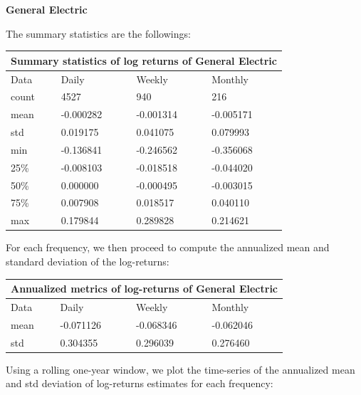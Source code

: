 \documentclass[10pt]{article}
\newenvironment{exercise}[2][Exercise]{\begin{trivlist}
  \item[\hskip \labelsep {\bfseries #1}\hskip \labelsep {\bfseries #2.}]}{\end{trivlist}}
\begin{document}
\begin{exercise}{4}
	\textbf{General Electric}
	
	\smallbreak
	
	The summary statistics are the followings:
	
	\bigbreak	
	
	\begin{tabular}{ |p{3cm}||p{3cm}|p{3cm}|p{3cm}|  }
 		\hline
		\multicolumn{4}{|c|}{Summary statistics of log returns of General Electric} \\
		\hline
		Data & Daily & Weekly & Monthly\\
 		\hline
 		count   &  4527 & 940 & 216\\
 		mean & -0.000282 & -0.001314 & -0.005171\\
 		std & 0.019175 & 0.041075 & 0.079993\\
 		min & -0.136841 & -0.246562 & -0.356068\\
 		25\% &  -0.008103 & -0.018518 & -0.044020\\
 		50\% & 0.000000 & -0.000495 & -0.003015\\
 		75\% & 0.007908 & 0.018517 & 0.040110\\
 		max & 0.179844 & 0.289828 & 0.214621\\
 		\hline
	\end{tabular}
	
	\bigbreak	
	
	For each frequency, we then proceed to compute the annualized mean and standard deviation of the log-returns:
	
	\bigbreak
	
	\begin{tabular}{ |p{3cm}||p{3cm}|p{3cm}|p{3cm}|  }
		\hline
	 	\multicolumn{4}{|c|}{Annualized metrics of log-returns of General Electric} \\
	 	\hline
	 	Data & Daily & Weekly & Monthly\\
 		\hline
 		mean  &  -0.071126 & -0.068346 & -0.062046\\
 		std & 0.304355 & 0.296039 & 0.276460\\
 		\hline
	\end{tabular}
	
	\bigbreak	
	
	Using a rolling one-year window, we plot the time-series of the annualized mean and std deviation of log-returns estimates for each frequency:
	
	\begin{figure}[H]
	

\end{figure}
\end{exercise}
\end{document}
